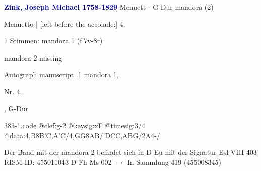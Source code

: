 \documentclass[twocolumn]{book}
\begin{document}
\newline \par \vspace{7pt} \textcolor{darkblue}{\textbf{Zink, Joseph Michael  1758-1829}}
\newline Menuett - G-Dur
\newline mandora (2)
\newline \begin{itshape}[f.7v, at left:] Menuetto | [left before the accolade:] 4.\end{itshape} 
\newline \textcolor{darkblue}{}  1 Stimmen: mandora 1  (f.7v-8r)
\newline \begin{small} mandora 2 missing\end{small} 
\newline Autograph manuscript
.1  mandora 1, \begin{itshape}Nr. 4.\end{itshape}, G-Dur  
\begin{filecontents*}{383-1.code}
@clef:g-2
@keysig:xF
@timesig:3/4
@data:4,B8B'C,A'C/4,GG{8AB}/'DCC,ABG/2A4-/
\end{filecontents*}
\newline
%
\newline Der Band mit der mandora 2 befindet sich in D Eu mit der Signatur Esl VIII 403
\newline RISM-ID: 455011043
\newline D-Fh  Ms 002
\newline $\rightarrow$ In Sammlung 419 (455008345)
      
\end{document}
